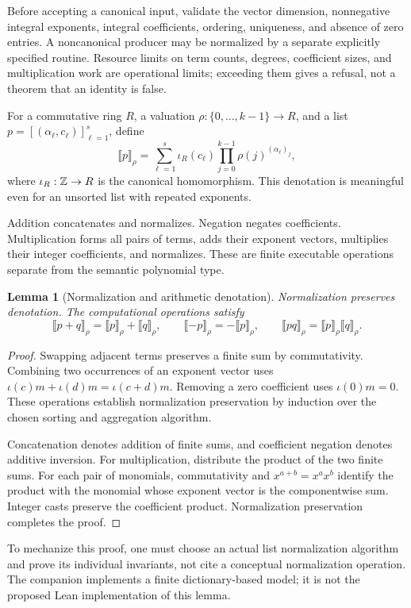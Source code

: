 \documentclass[11pt,letterpaper]{article}
\newtheorem{lemma}[theorem]{Lemma}
\theoremstyle{definition}\newtheorem{definition}[theorem]{Definition}
\newcommand{\sem}[1]{\llbracket #1\rrbracket}
\begin{document}
Before accepting a canonical input, validate the vector dimension, nonnegative integral exponents, integral coefficients, ordering, uniqueness, and absence of zero entries. A noncanonical producer may be normalized by a separate explicitly specified routine. Resource limits on term counts, degrees, coefficient sizes, and multiplication work are operational limits; exceeding them gives a refusal, not a theorem that an identity is false.

For a commutative ring $R$, a valuation $\rho:\{0,\ldots,k-1\}\to R$, and a list $p=[(\alpha_\ell,c_\ell)]_{\ell=1}^s$, define
\[
 \sem{p}_\rho
   =\sum_{\ell=1}^s\iota_R(c_\ell)
       \prod_{j=0}^{k-1}\rho(j)^{(\alpha_\ell)_j},
\]
where $\iota_R:\mathbb Z\to R$ is the canonical homomorphism. This denotation is meaningful even for an unsorted list with repeated exponents.

Addition concatenates and normalizes. Negation negates coefficients. Multiplication forms all pairs of terms, adds their exponent vectors, multiplies their integer coefficients, and normalizes. These are finite executable operations separate from the semantic polynomial type.

\begin{lemma}[Normalization and arithmetic denotation]\label{lem:denotation}
Normalization preserves denotation. The computational operations satisfy
\[
 \sem{p+q}_\rho=\sem p_\rho+\sem q_\rho,\qquad
 \sem{-p}_\rho=-\sem p_\rho,\qquad
 \sem{pq}_\rho=\sem p_\rho\sem q_\rho.
\]
\end{lemma}
\begin{proof}
Swapping adjacent terms preserves a finite sum by commutativity. Combining two occurrences of an exponent vector uses
$\iota(c)m+\iota(d)m=\iota(c+d)m$. Removing a zero coefficient uses $\iota(0)m=0$. These operations establish normalization preservation by induction over the chosen sorting and aggregation algorithm.

Concatenation denotes addition of finite sums, and coefficient negation denotes additive inversion. For multiplication, distribute the product of the two finite sums. For each pair of monomials, commutativity and $x^{a+b}=x^a x^b$ identify the product with the monomial whose exponent vector is the componentwise sum. Integer casts preserve the coefficient product. Normalization preservation completes the proof.
\end{proof}
To mechanize this proof, one must choose an actual list normalization algorithm and prove its individual invariants, not cite a conceptual normalization operation. The companion implements a finite dictionary-based model; it is not the proposed Lean implementation of this lemma.
\end{document}
